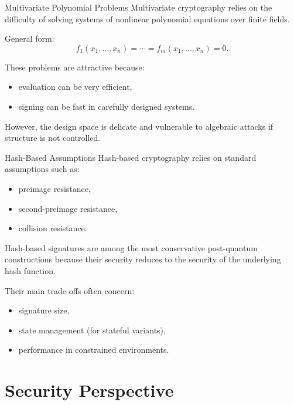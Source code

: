 \documentclass[aspectratio=169]{beamer}
\begin{document}
	\begin{frame}{Multivariate Polynomial Problems}
		Multivariate cryptography relies on the difficulty of solving systems of nonlinear polynomial equations over finite fields.
		
		\vspace{0.5em}
		General form:
		\[
		f_1(x_1,\dots,x_n)=\cdots=f_m(x_1,\dots,x_n)=0.
		\]
		
		\vspace{0.5em}
		These problems are attractive because:
		\begin{itemize}
			\item evaluation can be very efficient,
			\item signing can be fast in carefully designed systems.
		\end{itemize}
		
		\vspace{0.5em}
		However, the design space is delicate and vulnerable to algebraic attacks if structure is not controlled.
	\end{frame}
	
	\begin{frame}{Hash-Based Assumptions}
		Hash-based cryptography relies on standard assumptions such as:
		\begin{itemize}
			\item preimage resistance,
			\item second-preimage resistance,
			\item collision resistance.
		\end{itemize}
		
		\vspace{0.5em}
		Hash-based signatures are among the most conservative post-quantum constructions because their security reduces to the security of the underlying hash function.
		
		\vspace{0.5em}
		Their main trade-offs often concern:
		\begin{itemize}
			\item signature size,
			\item state management (for stateful variants),
			\item performance in constrained environments.
		\end{itemize}
	\end{frame}
	
	\section{Security Perspective}
	
\end{document}
